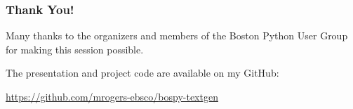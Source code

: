\begin{frame}
\frametitle{Thank You!}

Many thanks to the organizers and members of the Boston Python User Group\\
for making this session possible.

\vspace{24pt}

The presentation and project code are available on my GitHub:

\href{https://github.com/mrogers-ebsco/bospy-textgen}{https://github.com/mrogers-ebsco/bospy-textgen}
\end{frame}